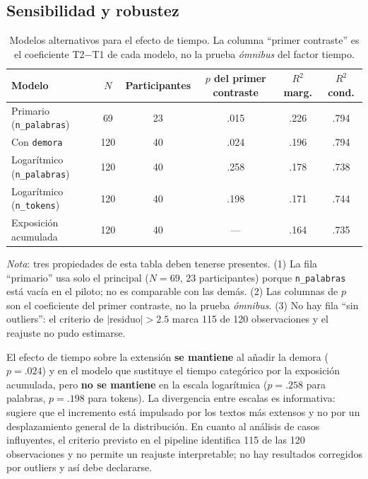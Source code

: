 \documentclass[12pt]{article}
\begin{document}
\subsection{Sensibilidad y robustez}

\begin{table}[htbp]
	\centering
	\caption{Modelos alternativos para el efecto de tiempo. La columna ``primer contraste'' es el
	coeficiente T2$-$T1 de cada modelo, no la prueba \emph{ómnibus} del factor tiempo.}
	\label{tab:robustez}
	\small
	\begin{tabular}{l c c c c c}
		\toprule
		Modelo & $N$ & Participantes & $p$ del primer contraste & $R^2$ marg. & $R^2$ cond. \\
		\midrule
		Primario (\texttt{n\_palabras})      & 69 & 23 & .015 & .226 & .794 \\
		Con \texttt{demora}                  & 120 & 40 & .024 & .196 & .794 \\
		Logarítmico (\texttt{n\_palabras})   & 120 & 40 & .258 & .178 & .738 \\
		Logarítmico (\texttt{n\_tokens})     & 120 & 40 & .198 & .171 & .744 \\
		Exposición acumulada                 & 120 & 40 & --- & .164 & .735 \\
		\bottomrule
	\end{tabular}
	\smallskip
	\emph{Nota}: tres propiedades de esta tabla deben tenerse presentes. (1) La fila
	``primario'' usa solo el principal ($N = 69$, 23 participantes) porque \texttt{n\_palabras}
	está vacía en el piloto; no es comparable con las demás. (2) Las columnas de $p$ son el
	coeficiente del primer contraste, no la prueba \emph{ómnibus}. (3) No hay fila ``sin
	outliers'': el criterio de $|$residuo$| > 2.5$ marca 115 de 120 observaciones y el reajuste
	no pudo estimarse.
\end{table}

El efecto de tiempo sobre la extensión \textbf{se mantiene} al añadir la demora
($p = .024$) y en el modelo que sustituye el tiempo categórico por la exposición acumulada, pero
\textbf{no se mantiene} en la escala logarítmica ($p = .258$ para palabras, $p = .198$ para
tokens). La divergencia entre escalas es informativa: sugiere que el incremento está impulsado
por los textos más extensos y no por un desplazamiento general de la distribución. En cuanto al
análisis de casos influyentes, el criterio previsto en el pipeline identifica 115 de las 120
observaciones y no permite un reajuste interpretable; no hay resultados corregidos por
outliers y así debe declararse.
\end{document}
